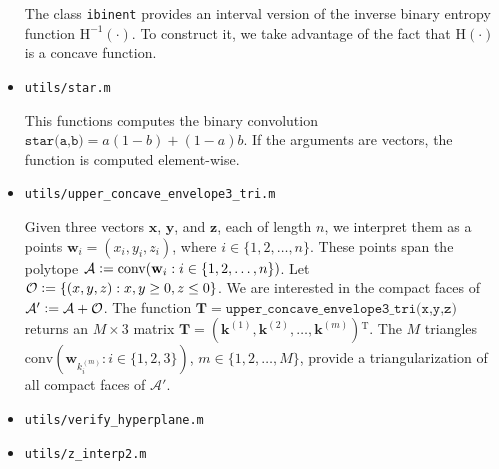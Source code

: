 \documentclass[a4paper,12pt]{scrartcl}
\newcommand{\cvx}[1]{\ensuremath{\mathrm{conv}(#1)}}
\newcommand{\mat}[1]{\ensuremath{\mathbf{#1}}}
\newcommand{\vt}[1]{\ensuremath{\mathbf{#1}}}
\newcommand{\transp}{\ensuremath{^{\mathrm T}}}
\newcommand{\AAA}{\ensuremath{\mathcal A}}
\newcommand{\OOO}{\ensuremath{\mathcal O}}
\newcommand{\defas}{\vcentcolon=}
\newcommand{\binEnt}[1]{\ensuremath{\mathrm{H}(#1)}}
\newcommand{\binEntInv}[1]{\ensuremath{\mathrm{H}^{-1}(#1)}}
\newcommand{\Nto}[1]{\ensuremath{\{1,2,\dots,#1\}}}
\begin{document}
\begin{itemize}
  The class \texttt{ibinent} provides an interval version of the inverse binary entropy function $\binEntInv{\cdot}$. To construct it, we take advantage of the fact that $\binEnt{\cdot}$ is a concave function.
  
  

  
\item \texttt{utils/star.m}

  This functions computes the binary convolution $\texttt{star(a,b)} = a (1-b) + (1-a) b$. If the arguments are vectors, the function is computed element-wise.
  
  
  
\item \texttt{utils/upper\_concave\_envelope3\_tri.m}

  Given three vectors $\vt x$, $\vt y$, and $\vt z$, each of length $n$, we interpret them as a points $\vt w_i = (x_i, y_i, z_i)$, where $i \in \Nto{n}$.
  These points span the polytope $\AAA \defas \cvx{\vt w_i : i \in \Nto{n}}$. Let $\OOO \defas \{(x,y,z) : x,y \ge 0, z \le 0 \}$. We are interested in the compact faces of $\AAA' \defas \AAA + \OOO$. The function $\mat T = \texttt{upper\_concave\_envelope3\_tri(x,y,z)}$ returns an $M \times 3$ matrix $\mat T = (\vt k^{(1)}, \vt k^{(2)}, \dots ,\vt k^{(m)})\transp$. The $M$ triangles $\cvx{\vt w_{k^{(m)}_i} : i \in \{1,2,3\}}$, $m \in \Nto{M}$, provide a triangularization of all compact faces of $\AAA'$.
  
  
  
\item \texttt{utils/verify\_hyperplane.m}

  
\item \texttt{utils/z\_interp2.m}

  
\end{itemize}
 


\printbibliography[heading=bibintoc]
\end{document}
